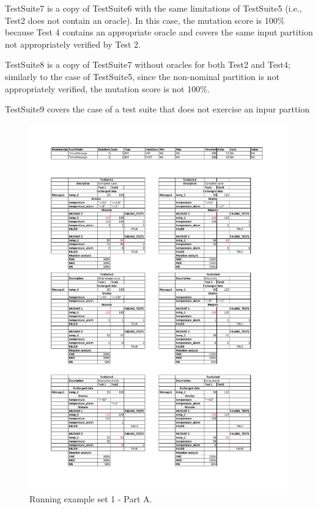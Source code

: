 TestSuite7 is a copy of TestSuite6 with the same limitations of TestSuite5 (i.e., Test2 does not contain an oracle).
In this case, the mutation score is 100\% because Test 4 contains an appropriate oracle and covers the same input partition not appropriately verified by Test 2.

TestSuite8 is a copy of TestSuite7 without oracles for both Test2 and Test4; similarly to the case of TestSuite5, since the non-nominal partition is not appropriately verified, the mutation score is not 100\%.

TestSuite9 covers the case of a test suite that does not exercise an inpur parttion

\begin{figure}[tb]
\centering
\includegraphics[width=18cm]{damat/DataDrivenExample1A}
\caption{Running example set 1 - Part A.}
\label{fig:damat:RunningExample1A}
\end{figure}


